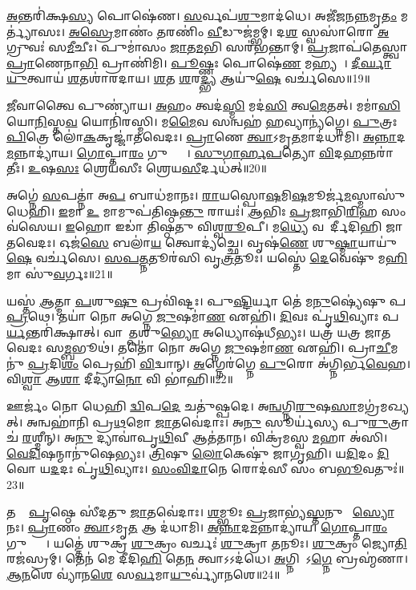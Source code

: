 \ul{𑌅}𑌨𑍍𑌤𑌰𑌿॑𑌕𑍍𑌷\ul{𑌸𑍍𑌯} 𑌪𑍋𑌷𑍇॑𑌣।
\ul{𑌸}𑌰𑍍𑌵𑌪॑\ul{𑌶𑍁}𑌮𑌾𑌦॑𑌧𑍇।
𑌅𑌜𑍀॑𑌜𑌨\ul{𑌨𑍍𑌨}𑌮𑍃\ul{𑌤𑌂} 𑌮𑌰𑍍𑌤𑍍𑌯𑌾॑𑌸𑌃।
\ul{𑌅}\ul{𑌸𑍍𑌰𑍇}𑌮𑌾𑌣𑌂॑ \ul{𑌤}𑌰𑌣𑌿𑌂॑ \ul{𑌵𑍀}𑌡𑍁𑌜॑𑌮𑍍𑌭𑌮𑍍।
𑌦\ul{𑌶} 𑌸𑍍𑌵𑌸𑌾॑𑌰𑍋 \ul{𑌅}𑌗𑍍𑌰𑍁𑌵𑌃॑ 𑌸\ul{𑌮𑍀}𑌚𑍀𑌃।
𑌪𑍁𑌮𑌾॑𑌸𑌂 \ul{𑌜𑌾}𑌤\ul{𑌮}𑌭𑌿 𑌸𑌰॑𑌭𑌨𑍍𑌤𑌾𑌮𑍍।
\ul{𑌪𑍍𑌰}𑌜𑌾𑌪॑𑌤𑍇𑌸𑍍𑌤𑍍𑌵𑌾 \ul{𑌪𑍍𑌰𑌾}𑌣𑍇𑌨𑌾\ul{𑌭𑌿} 𑌪𑍍𑌰𑌾𑌣𑌿॑𑌮𑌿।
\ul{𑌪𑍂}𑌷𑍍𑌣𑌃 𑌪𑍋𑌷𑍇॑\ul{𑌣} 𑌮𑌹𑍍𑌯𑌮𑍍᳚।
\ul{𑌦𑍀}\ul{𑌰𑍍𑌘𑌾}\ul{𑌯𑍁}𑌤𑍍𑌵𑌾𑌯॑ \ul{𑌶}𑌤𑌶𑌾॑𑌰𑌦𑌾𑌯।
\ul{𑌶}𑌤 \ul{𑌶}𑌰\ul{𑌦𑍍𑌭𑍍𑌯} 𑌆𑌯𑍁॑\ul{𑌷𑍇} 𑌵𑌰𑍍𑌚॑𑌸𑍇॥19॥

\ul{𑌜𑍀}𑌵𑌾𑌤𑍍𑌵𑍈 𑌪𑍁𑌣𑍍𑌯𑌾॑𑌯।
\ul{𑌅}𑌹𑌂 𑌤𑍍𑌵𑌦॑\ul{𑌸𑍍𑌮𑌿} 𑌮𑌦॑\ul{𑌸𑌿} 𑌤𑍍𑌵\ul{𑌮𑍇}𑌤𑌤𑍍।
𑌮𑌮𑌾॑\ul{𑌸𑌿} 𑌯𑍋\ul{𑌨𑌿}𑌸𑍍𑌤\ul{𑌵} 𑌯𑍋𑌨𑌿॑𑌰𑌸𑍍𑌮𑌿।
𑌮\ul{𑌮𑍈}𑌵 𑌸𑌨𑍍𑌵𑌹॑ \ul{𑌹}𑌵𑍍𑌯𑌾𑌨𑍍𑌯॑𑌗𑍍𑌨𑍇।
\ul{𑌪𑍁}𑌤𑍍𑌰𑌃 \ul{𑌪𑌿}𑌤𑍍𑌰𑍇 𑌲𑍋॑\ul{𑌕}𑌕𑍃𑌜𑍍𑌜𑌾॑𑌤𑌵𑍇𑌦𑌃।
\ul{𑌪𑍍𑌰𑌾}𑌣𑍇 \ul{𑌤𑍍𑌵𑌾}\-𑌽𑌮𑍃\ul{𑌤}𑌮𑌾𑌦॑𑌧𑌾𑌮𑌿।
\ul{𑌅}\ul{𑌨𑍍𑌨𑌾}𑌦\ul{𑌮}𑌨𑍍𑌨𑌾𑌦𑍍𑌯𑌾॑𑌯।
\ul{𑌗𑍋}𑌪𑍍𑌤𑌾\ul{𑌰𑌂} 𑌗𑍁𑌪𑍍𑌤𑍍𑌯𑍈᳚।
\ul{𑌸𑍁}\ul{𑌗𑌾}\ul{𑌰𑍍}\ul{𑌹}\ul{𑌪}𑌤𑍍𑌯𑍋 \ul{𑌵𑌿}𑌦\ul{𑌹}𑌨𑍍𑌨𑌰𑌾॑𑌤𑍀𑌃।
\ul{𑌉}𑌷\ul{𑌸𑌃} 𑌶𑍍𑌰𑍇𑌯॑𑌸𑍀𑌃 𑌶𑍍𑌰𑍇𑌯\ul{𑌸𑍀}𑌰𑍍𑌦𑌧॑𑌤𑍍॥20॥

𑌅𑌗𑍍𑌨𑍇॑ \ul{𑌸}𑌪𑌤𑍍𑌨𑌾॑ 𑌅\ul{𑌪} 𑌬𑌾𑌧॑𑌮𑌾𑌨𑌃।
\ul{𑌰𑌾}𑌯𑌸𑍍𑌪𑍋\ul{𑌷}𑌮𑌿\ul{𑌷}𑌮𑍂𑌰𑍍𑌜॑\ul{𑌮}𑌸𑍍𑌮𑌾𑌸𑍁॑ 𑌧𑍇𑌹𑌿।
\ul{𑌇}𑌮𑌾 \ul{𑌉} 𑌮𑌾𑌮𑍁𑌪॑𑌤𑌿𑌷𑍍𑌠\ul{𑌨𑍍𑌤𑍁} 𑌰𑌾𑌯𑌃॑।
\ul{𑌆}𑌭𑌿𑌃 \ul{𑌪𑍍𑌰}𑌜𑌾𑌭𑌿॑\ul{𑌰𑌿}𑌹 𑌸𑌂𑌵॑𑌸𑍇𑌯।
\ul{𑌇}𑌹𑍋 𑌇𑌡𑌾॑ 𑌤𑌿𑌷𑍍𑌠𑌤𑍁 𑌵𑌿𑌶𑍍𑌵\ul{𑌰𑍂}𑌪𑍀।
𑌮\ul{𑌧𑍍𑌯𑍇} 𑌵𑌸𑍋᳚𑌰𑍍𑌦𑍀𑌦𑌿𑌹𑌿 𑌜𑌾𑌤𑌵𑍇𑌦𑌃।
𑌓𑌜॑\ul{𑌸𑍇} 𑌬𑌲𑌾॑\ul{𑌯} 𑌤𑍍𑌵𑍋𑌦𑍍𑌯॑𑌚𑍍𑌛𑍇।
𑌵𑍃𑌷॑\ul{𑌣𑍇} 𑌶𑍁\ul{𑌷𑍍𑌮𑌾}𑌯𑌾𑌯𑍁॑\ul{𑌷𑍇} 𑌵𑌰𑍍𑌚॑𑌸𑍇।
\ul{𑌸}\ul{𑌪}\ul{𑌤𑍍𑌨}𑌤𑍂𑌰॑𑌸𑌿 𑌵𑍃\ul{𑌤𑍍𑌰}𑌤𑍂𑌃।
𑌯𑌸𑍍𑌤𑍇॑ \ul{𑌦𑍇}𑌵𑍇𑌷𑍁॑ 𑌮\ul{𑌹𑌿}𑌮𑌾 𑌸𑍁॑\ul{𑌵}𑌰𑍍𑌗𑌃॥21॥

𑌯𑌸𑍍𑌤॑ \ul{𑌆}𑌤𑍍𑌮𑌾 \ul{𑌪}𑌶𑍁\ul{𑌷𑍁} 𑌪𑍍𑌰𑌵𑌿॑𑌷𑍍𑌟𑌃।
𑌪𑍁\ul{𑌷𑍍𑌟𑌿}𑌰𑍍𑌯𑌾 𑌤𑍇॑ 𑌮\ul{𑌨𑍁}𑌷𑍍𑌯𑍇॑𑌷𑍁 𑌪\ul{𑌪𑍍𑌰}𑌥𑍇।
𑌤𑌯𑌾॑ 𑌨𑍋 𑌅𑌗𑍍𑌨𑍇 \ul{𑌜𑍁}𑌷𑌮𑌾॑\ul{𑌣} 𑌏𑌹𑌿॑।
\ul{𑌦𑌿}𑌵𑌃 𑌪𑍃॑\ul{𑌥𑌿}𑌵𑍍𑌯𑌾𑌃 𑌪\ul{𑌰𑍍𑌯}𑌨𑍍𑌤𑌰𑌿॑𑌕𑍍𑌷𑌾𑌤𑍍।
𑌵𑌾𑌤𑌾᳚\ul{𑌤𑍍𑌪}𑌶𑍁\ul{𑌭𑍍𑌯𑍋} 𑌅𑌧𑍍𑌯𑍋𑌷॑𑌧𑍀𑌭𑍍𑌯𑌃।
𑌯𑌤𑍍𑌰॑ 𑌯𑌤𑍍𑌰 𑌜𑌾𑌤𑌵𑍇𑌦𑌃 𑌸\ul{𑌮𑍍𑌬}𑌭𑍂𑌥॑।
𑌤𑌤𑍋॑ 𑌨𑍋 𑌅𑌗𑍍𑌨𑍇 \ul{𑌜𑍁}𑌷𑌮𑌾॑\ul{𑌣} 𑌏𑌹𑌿॑।
𑌪𑍍𑌰𑌾\ul{𑌚𑍀}𑌮𑌨𑍁॑ \ul{𑌪𑍍𑌰}𑌦𑌿\ul{𑌶𑌂} 𑌪𑍍𑌰𑍇𑌹𑌿॑ \ul{𑌵𑌿}𑌦𑍍𑌵𑌾𑌨𑍍।
\ul{𑌅}𑌗𑍍𑌨𑍇𑌰॑𑌗𑍍𑌨𑍇 \ul{𑌪𑍁}𑌰𑍋 𑌅॑𑌗𑍍𑌨𑌿𑌰𑍍𑌭\ul{𑌵𑍇}𑌹।
𑌵𑌿\ul{𑌶𑍍𑌵𑌾} 𑌆\ul{𑌶𑌾} 𑌦𑍀𑌦𑍍𑌯𑌾॑\ul{𑌨𑍋} 𑌵𑌿 𑌭𑌾॑𑌹𑌿॥22॥

𑌊𑌰𑍍𑌜𑌂॑ 𑌨𑍋 𑌧𑍇𑌹𑌿 \ul{𑌦𑍍𑌵𑌿}𑌪\ul{𑌦𑍇} 𑌚𑌤𑍁॑𑌷𑍍𑌪𑌦𑍇।
𑌅\ul{𑌨𑍍𑌵}𑌗𑍍𑌨𑌿\ul{𑌰𑍁}𑌷\ul{𑌸𑌾}𑌮𑌗𑍍𑌰॑𑌮𑌖𑍍𑌯𑌤𑍍।
𑌅𑌨𑍍𑌵𑌹𑌾॑𑌨𑌿 𑌪𑍍𑌰\ul{𑌥}𑌮𑍋 \ul{𑌜𑌾}𑌤𑌵𑍇॑𑌦𑌾𑌃।
𑌅\ul{𑌨𑍁} 𑌸𑍂𑌰𑍍𑌯॑𑌸𑍍𑌯 𑌪𑍁\ul{𑌰𑍁}𑌤𑍍𑌰𑌾 𑌚॑ \ul{𑌰}𑌶𑍍𑌮𑍀𑌨𑍍।
𑌅\ul{𑌨𑍁} 𑌦𑍍𑌯𑌾𑌵𑌾॑𑌪𑍃\ul{𑌥𑌿}𑌵𑍀 𑌆𑌤॑𑌤𑌾𑌨।
𑌵𑌿𑌕𑍍𑌰॑𑌮𑌸𑍍𑌵 \ul{𑌮}𑌹𑌾 𑌅॑𑌸𑌿।
\ul{𑌵𑍇}\ul{𑌦𑌿}𑌷𑌨𑍍𑌮𑌾𑌨𑍁॑𑌷𑍇𑌭𑍍𑌯𑌃।
\ul{𑌤𑍍𑌰𑌿}𑌷𑍁 \ul{𑌲𑍋}𑌕𑍇𑌷𑍁॑ 𑌜𑌾𑌗𑍃𑌹𑌿।
𑌯\ul{𑌦𑌿}𑌦𑌂 \ul{𑌦𑌿}𑌵𑍋 𑌯\ul{𑌦}𑌦𑌃 𑌪𑍃॑\ul{𑌥𑌿}𑌵𑍍𑌯𑌾𑌃।
\ul{𑌸𑌂}\ul{𑌵𑌿}\ul{𑌦𑌾}𑌨𑍇 𑌰𑍋𑌦॑𑌸𑍀 𑌸𑌂 𑌬\ul{𑌭𑍂}𑌵𑌤𑍁𑌃॑॥23॥

𑌤𑌯𑍋𑌃᳚ \ul{𑌪𑍃}𑌷𑍍𑌠𑍇 𑌸𑍀॑𑌦𑌤𑍁 \ul{𑌜𑌾}𑌤𑌵𑍇॑𑌦𑌾𑌃।
\ul{𑌶}𑌮𑍍𑌭𑍂𑌃 \ul{𑌪𑍍𑌰}𑌜𑌾𑌭𑍍𑌯॑\ul{𑌸𑍍𑌤}𑌨𑍁𑌵𑍇᳚ \ul{𑌸𑍍𑌯𑍋}𑌨𑌃।
\ul{𑌪𑍍𑌰𑌾}𑌣𑌂 \ul{𑌤𑍍𑌵𑌾}\-𑌽𑌮𑍃\ul{𑌤} 𑌆 𑌦॑𑌧𑌾𑌮𑌿।
\ul{𑌅}\ul{𑌨𑍍𑌨𑌾}𑌦\ul{𑌮}𑌨𑍍𑌨𑌾𑌦𑍍𑌯𑌾॑𑌯।
\ul{𑌗𑍋}𑌪𑍍𑌤𑌾\ul{𑌰𑌂} 𑌗𑍁𑌪𑍍𑌤𑍍𑌯𑍈᳚।
𑌯𑌤𑍍𑌤𑍇॑ 𑌶𑍁𑌕𑍍𑌰 \ul{𑌶𑍁}𑌕𑍍𑌰𑌂 𑌵𑌰𑍍𑌚𑌃॑ \ul{𑌶𑍁}𑌕𑍍𑌰𑌾 \ul{𑌤}𑌨𑍂𑌃।
\ul{𑌶𑍁}𑌕𑍍𑌰𑌂 𑌜𑍍𑌯𑍋\ul{𑌤𑌿}𑌰𑌜॑𑌸𑍍𑌰𑌮𑍍।
𑌤𑍇𑌨॑ 𑌮𑍇 𑌦𑍀𑌦𑌿\ul{𑌹𑌿} 𑌤𑍇\ul{𑌨} 𑌤𑍍𑌵𑌾𑌽𑌽𑌦॑𑌧𑍇।
\ul{𑌅}𑌗𑍍𑌨𑌿𑌨𑌾᳚\-𑌽\ul{𑌗𑍍𑌨𑍇} 𑌬𑍍𑌰𑌹𑍍𑌮॑𑌣𑌾।
\ul{𑌆}\ul{𑌨}𑌶𑍇 𑌵𑍍𑌯𑌾॑𑌨\ul{𑌶𑍇} 𑌸\ul{𑌰𑍍𑌵}𑌮𑌾\ul{𑌯𑍁}𑌰𑍍𑌵𑍍𑌯𑌾॑𑌨𑌶𑍇॥24॥

